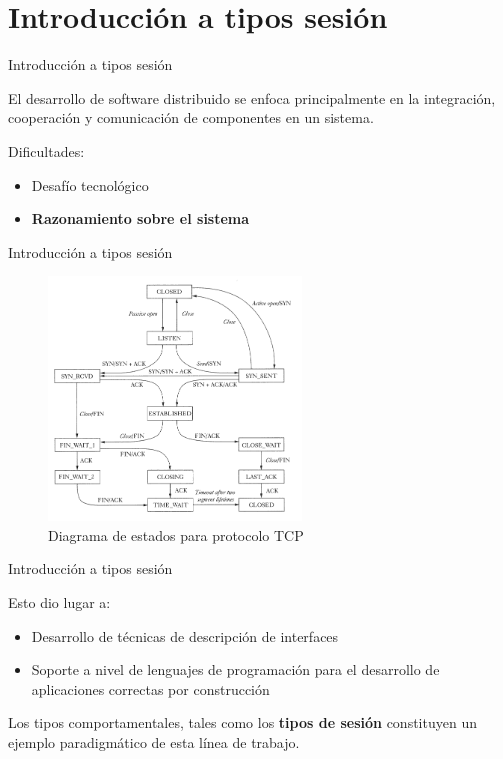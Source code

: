 \section{Introducción a tipos sesión}

\begin{frame}{Introducción a tipos sesión}

	El desarrollo de software distribuido se enfoca principalmente en la
	integración, cooperación y comunicación de componentes en un sistema.

	\bigskip

	Dificultades:
	\begin{itemize}
		\item{Desafío tecnológico}
		\item{\textbf<2>{Razonamiento sobre el sistema}}
		\pause
	\end{itemize}
\end{frame}

\begin{frame}{Introducción a tipos sesión}
	\begin{figure}
		\centering
		\includegraphics[width=0.6\textwidth]{images/tcp-state-diagram.png}
		\caption{Diagrama de estados para protocolo \textsc{TCP}}
	\end{figure}
\end{frame}

\begin{frame}{Introducción a tipos sesión}

	Esto dio lugar a:

	\begin{itemize}
		\item Desarrollo de técnicas de descripción de interfaces
		\item Soporte a nivel de lenguajes de programación para el desarrollo de aplicaciones correctas por construcción
	\end{itemize}

	\pause

	Los tipos comportamentales, tales como los \textbf{tipos de sesión} constituyen
	un ejemplo paradigmático de esta línea de trabajo.
\end{frame}

